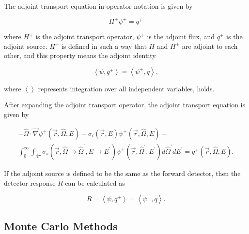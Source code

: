 The adjoint transport equation in operator notation is given by

\begin{equation}\label{eq:bg:rt:adjoint-transport-operator}
  H^+\psi^+ = q^+
\end{equation}

where $H^+$ is the adjoint transport operator, $\psi^+$ is the adjoint flux, and $q^+$ is the adjoint source.
$H^+$ is defined in such a way that $H$ and $H^+$ are adjoint to each other, and this property means the adjoint identity

\begin{equation}\label{eq:bg:rt:adjoint-identity}
  \left<\psi,q^+\right> =
  \left<\psi^+,q\right>,
\end{equation}

where $\left<\right>$ represents integration over all independent variables, holds.

After expanding the adjoint transport operator, the adjoint transport equation is given by

\begin{multline}\label{eq:bg:rt:adjoint-transport}
  -\hat{\Omega}\cdot\vec{\nabla}\psi^+\left(\vec{r},\hat{\Omega},E\right) +
  \sigma_t\left(\vec{r},E\right)\psi^+\left(\vec{r},\hat{\Omega},E\right) - \\
  \int_0^\infty\int_{4\pi}\sigma_s\left(\vec{r},\hat{\Omega}\rightarrow\hat{\Omega}^\prime,E\rightarrow E^\prime\right)\psi^+\left(\vec{r},\hat{\Omega}^\prime,E^\prime\right)d\hat{\Omega}^\prime dE^\prime =
  q^+\left(\vec{r},\hat{\Omega},E\right).
\end{multline}

If the adjoint source is defined to be the same as the forward detector, then the detector response $R$ can be calculated as

\begin{equation}\label{eq:bg:rt:detector-response}
  R = \left<\psi,q^+\right>
    = \left<\psi^+,q\right>.
\end{equation}


\subsection{Monte Carlo Methods}
\label{sec:bg:rt:mc}

